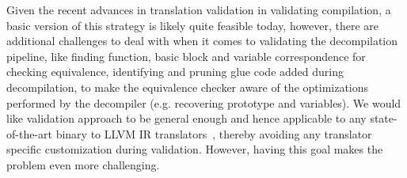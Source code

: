 Given the recent advances in translation validation in validating compilation,
      a basic version of this strategy is likely quite feasible today, however,
      there are additional challenges to deal with when it comes to validating
      the decompilation pipeline, like finding function, basic block and
      variable correspondence for checking equivalence, identifying and pruning
      glue code added during decompilation, to make the equivalence checker
      aware of the optimizations performed by the decompiler (e.g.  recovering
          prototype and variables). We would like validation approach to be
      general enough and hence applicable to any state-of-the-art binary to
      LLVM IR translators~\cite{McSema:Recon14,Remill,FCD,reopt,llvm-mctoll},
      thereby avoiding any translator specific customization during validation.
      However, having this goal makes the problem even more challenging.
      
      

